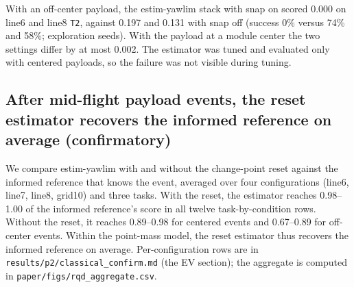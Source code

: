\documentclass[conference]{IEEEtran}
\newcommand{\TT}{\texttt{T2}}
\begin{document}
With an off-center payload, the estim-yawlim stack with snap on scored 0.000 on line6 and line8 \TT, against 0.197 and 0.131 with snap off (success 0\% versus 74\% and 58\%; exploration seeds). %
With the payload at a module center the two settings differ by at most 0.002. %
The estimator was tuned and evaluated only with centered payloads, so the failure was not visible during tuning. %

\subsection{After mid-flight payload events, the reset estimator recovers the informed reference on average (confirmatory)}
We compare estim-yawlim with and without the change-point reset against the informed reference that knows the event, averaged over four configurations (line6, line7, line8, grid10) and three tasks. %
With the reset, the estimator reaches 0.98--1.00 of the informed reference's score in all twelve task-by-condition rows. %
Without the reset, it reaches 0.89--0.98 for centered events and 0.67--0.89 for off-center events. %
Within the point-mass model, the reset estimator thus recovers the informed reference on average.
Per-configuration rows are in \texttt{results/p2/classical\_confirm.md} (the EV section); the aggregate is computed in \texttt{paper/figs/rqd\_aggregate.csv}. %
\end{document}
